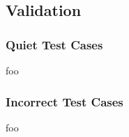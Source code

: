 \subsection{Validation}

\subsubsection{Quiet Test Cases}

foo


%

\subsubsection{Incorrect Test Cases}

foo


%
